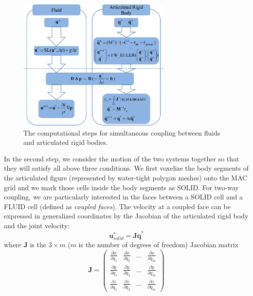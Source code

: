 \begin{figure}[t]
\centering
\includegraphics[width=3in]{figures/CouplingProcess.eps}
\caption{The computational steps for simultaneous coupling between fluids and articulated rigid bodies.}
\label{fig:graph}
\end{figure}

In the second step, we consider the motion of the two systems together so
that they will satisfy all above three conditions. We first voxelize the
body segments of the articulated figure (represented by water-tight
polygon meshes) onto the MAC grid and we mark those cells inside the body
segments as SOLID. For two-way coupling, we are particularly interested in
the faces between a SOLID cell and a FLUID cell (defined as \emph{coupled
faces}). The velocity at a coupled face can be expressed in generalized
coordinates by the Jacobian of the articulated rigid body and the joint
velocity:
\begin{displaymath}
\mathbf{u}^*_{solid}=\mathbf{J}\mathbf{\dot{q}}^*
\end{displaymath}
where $\mathbf{J}$ is the $3\times m$ ($m$ is the number of degrees of freedom) Jacobian matrix
\begin{displaymath}
\mathbf{J}=
\left( \begin{array}{cccc}
\frac{\partial x}{\partial q_1} & \frac{\partial x}{\partial q_2} & \ldots & \frac{\partial x}{\partial q_m} \\
\frac{\partial y}{\partial q_1} & \frac{\partial y}{\partial q_2} & \ldots & \frac{\partial y}{\partial q_m} \\
\frac{\partial z}{\partial q_1} & \frac{\partial z}{\partial q_2} & \ldots & \frac{\partial z}{\partial q_m}
\end{array} \right)
\end{displaymath}

